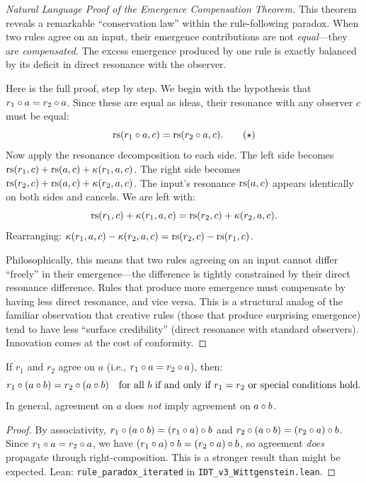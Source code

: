 \begin{proof}[Natural Language Proof of the Emergence Compensation Theorem]
This theorem reveals a remarkable ``conservation law'' within the rule-following
paradox. When two rules agree on an input, their emergence contributions are
not \emph{equal}---they are \emph{compensated}. The excess emergence produced
by one rule is exactly balanced by its deficit in direct resonance with the
observer.

Here is the full proof, step by step. We begin with the hypothesis that
$r_1 \circ a = r_2 \circ a$. Since these are equal as ideas, their
resonance with any observer $c$ must be equal:
\[
\mathrm{rs}(r_1 \circ a, c) = \mathrm{rs}(r_2 \circ a, c). \tag{$\star$}
\]
Now apply the resonance decomposition to each side. The left side becomes
$\mathrm{rs}(r_1, c) + \mathrm{rs}(a, c) + \kappa(r_1, a, c)$. The right side becomes
$\mathrm{rs}(r_2, c) + \mathrm{rs}(a, c) + \kappa(r_2, a, c)$. The input's resonance
$\mathrm{rs}(a, c)$ appears identically on both sides and cancels. We are left with:
\[
\mathrm{rs}(r_1, c) + \kappa(r_1, a, c) = \mathrm{rs}(r_2, c) + \kappa(r_2, a, c).
\]
Rearranging: $\kappa(r_1, a, c) - \kappa(r_2, a, c) = \mathrm{rs}(r_2, c) - \mathrm{rs}(r_1, c)$.

Philosophically, this means that two rules agreeing on an input cannot differ
``freely'' in their emergence---the difference is tightly constrained by their
direct resonance difference. Rules that produce more emergence must compensate
by having less direct resonance, and vice versa. This is a structural analog
of the familiar observation that creative rules (those that produce surprising
emergence) tend to have less ``surface credibility'' (direct resonance with
standard observers). Innovation comes at the cost of conformity.
\end{proof}

\begin{theorem}
\label{thm:iterated-agreement}
If $r_1$ and $r_2$ agree on $a$ (i.e., $r_1 \circ a = r_2 \circ a$), then:
\[
r_1 \circ (a \circ b) = r_2 \circ (a \circ b) \quad
\text{for all } b \text{ if and only if } r_1 = r_2 \text{ or special conditions hold.}
\]
In general, agreement on $a$ does \emph{not} imply agreement on $a \circ b$.
\end{theorem}

\begin{proof}
By associativity, $r_1 \circ (a \circ b) = (r_1 \circ a) \circ b$
and $r_2 \circ (a \circ b) = (r_2 \circ a) \circ b$. Since
$r_1 \circ a = r_2 \circ a$, we have $(r_1 \circ a) \circ b
= (r_2 \circ a) \circ b$, so agreement \emph{does} propagate through
right-composition. This is a stronger result than might be expected.
Lean: \texttt{rule\_paradox\_iterated} in \texttt{IDT\_v3\_Wittgenstein.lean}.
\end{proof}

